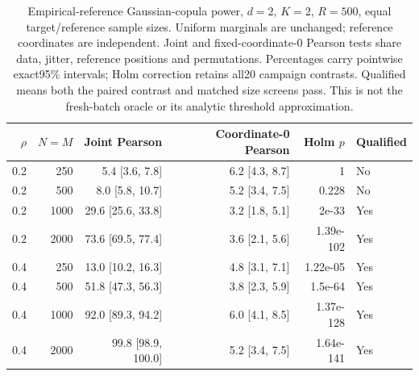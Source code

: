 \begin{table}[t]
\centering
\scriptsize
\caption{Empirical-reference Gaussian-copula power, $d=2$, $K=2$, $R=500$, equal target/reference sample sizes. Uniform marginals are unchanged; reference coordinates are independent. Joint and fixed-coordinate-0 Pearson tests share data, jitter, reference positions and permutations. Percentages carry pointwise exact95\% intervals; Holm correction retains all20 campaign contrasts. Qualified means both the paired contrast and matched size screens pass. This is not the fresh-batch oracle or its analytic threshold approximation.}
\label{tab:dependence-gaussian-power}
{\setlength{\tabcolsep}{8pt}\renewcommand{\arraystretch}{1.2}
\begin{tabular}{rrrrrl}
\toprule
$\rho$ & $N=M$ & Joint Pearson & Coordinate-0 Pearson & Holm $p$ & Qualified\\
\midrule
0.2 & 250 & 5.4 [3.6, 7.8] & 6.2 [4.3, 8.7] & 1 & No\\
0.2 & 500 & 8.0 [5.8, 10.7] & 5.2 [3.4, 7.5] & 0.228 & No\\
0.2 & 1000 & 29.6 [25.6, 33.8] & 3.2 [1.8, 5.1] & 2e-33 & Yes\\
0.2 & 2000 & 73.6 [69.5, 77.4] & 3.6 [2.1, 5.6] & 1.39e-102 & Yes\\
0.4 & 250 & 13.0 [10.2, 16.3] & 4.8 [3.1, 7.1] & 1.22e-05 & Yes\\
0.4 & 500 & 51.8 [47.3, 56.3] & 3.8 [2.3, 5.9] & 1.5e-64 & Yes\\
0.4 & 1000 & 92.0 [89.3, 94.2] & 6.0 [4.1, 8.5] & 1.37e-128 & Yes\\
0.4 & 2000 & 99.8 [98.9, 100.0] & 5.2 [3.4, 7.5] & 1.64e-141 & Yes\\
\bottomrule
\end{tabular}}
\end{table}

